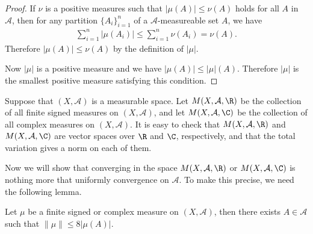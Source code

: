 \begin{proof}
If $\nu$ is a positive measures such that $|\mu(A)|\leq\nu(A)$ holds for all $A$ in $\mathcal{A}$, then for any partition $\{A_i\}_{i=1}^{n}$ of a $\mathcal{A}$-measureable set $A$, we have
\begin{align*}
\sum_{i=1}^{n}|\mu(A_i)|\leq\sum_{i=1}^{n}\nu(A_i)=\nu(A).
\end{align*}
Therefore $|\mu(A)|\leq\nu(A)$ by the definition of $|\mu|$.\par
Now $|\mu|$ is a positive measure and we have $|\mu(A)|\leq|\mu|(A)$. Therefore $|\mu|$ is the smallest positive measure satisfying this condition.
\end{proof}
Suppose that $(X,\mathcal{A})$ is a measurable space. Let $M(X,\mathcal{A},\R)$ be the collection of all finite signed measures on $(X,\mathcal{A})$, and let $M(X,\mathcal{A},\C)$ be the collection of all complex measures on $(X,\mathcal{A})$. It is easy to check that $M(X,\mathcal{A},\R)$ and $M(X,\mathcal{A},\C)$ are vector spaces over $\R$ and $\C$, respectively, and that the total variation gives a norm on each of them.\par
Now we will show that converging in the space $M(X,\mathcal{A},\R)$ or $M(X,\mathcal{A},\C)$ is nothing more that uniformly convergence on $\mathcal{A}$. To make this precise, we need the following lemma.
\begin{lemma}\label{total variation approximation}
Let $\mu$ be a finite signed or complex measure on $(X,\mathcal{A})$, then there exists $A\in\mathcal{A}$ such that $\|\mu\|\leq 8|\mu(A)|$.
\end{lemma}
